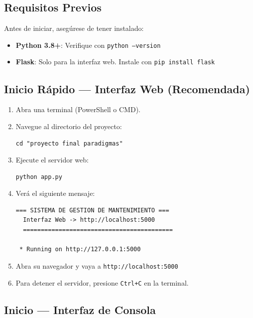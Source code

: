 \documentclass[12pt, a4paper]{article}
\begin{document}
\subsection{Requisitos Previos}

Antes de iniciar, aseg\'urese de tener instalado:

\begin{itemize}[leftmargin=2em]
    \item \textbf{Python 3.8+}: Verifique con \texttt{python --version}
    \item \textbf{Flask}: Solo para la interfaz web. Instale con \texttt{pip install flask}
\end{itemize}

\subsection{Inicio R\'apido --- Interfaz Web (Recomendada)}

\begin{enumerate}[leftmargin=2em]
    \item Abra una terminal (PowerShell o CMD).
    \item Navegue al directorio del proyecto:
    \begin{lstlisting}
cd "proyecto final paradigmas"
    \end{lstlisting}
    \item Ejecute el servidor web:
    \begin{lstlisting}
python app.py
    \end{lstlisting}
    \item Ver\'a el siguiente mensaje:
    \begin{lstlisting}[style=console]
  === SISTEMA DE GESTION DE MANTENIMIENTO ===
  Interfaz Web -> http://localhost:5000
  ==========================================

 * Running on http://127.0.0.1:5000
    \end{lstlisting}
    \item Abra su navegador y vaya a \texttt{http://localhost:5000}
    \item Para detener el servidor, presione \texttt{Ctrl+C} en la terminal.
\end{enumerate}

\subsection{Inicio --- Interfaz de Consola}
\end{document}
